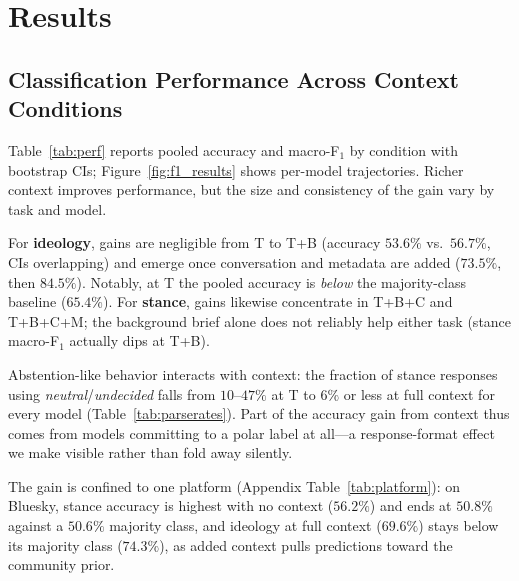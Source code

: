 \documentclass[11pt]{article}
\begin{document}
\section{Results}
\label{sec:results}

\subsection{Classification Performance Across Context Conditions}
\label{sec:results_performance}

Table~\ref{tab:perf} reports pooled accuracy and macro-F$_1$ by condition with bootstrap CIs; Figure~\ref{fig:f1_results} shows per-model trajectories. Richer context improves performance, but the size and consistency of the gain vary by task and model.

For \textbf{ideology}, gains are negligible from T to T+B (accuracy $53.6\%$ vs.\ $56.7\%$, CIs overlapping) and emerge once conversation and metadata are added ($73.5\%$, then $84.5\%$). Notably, at T the pooled accuracy is \emph{below} the majority-class baseline ($65.4\%$). For \textbf{stance}, gains likewise concentrate in T+B+C and T+B+C+M; the background brief alone does not reliably help either task (stance macro-F$_1$ actually dips at T+B).

Abstention-like behavior interacts with context: the fraction of stance responses using \emph{neutral}/\emph{undecided} falls from $10$--$47\%$ at T to $6\%$ or less at full context for every model (Table~\ref{tab:parserates}). Part of the accuracy gain from context thus comes from models committing to a polar label at all---a response-format effect we make visible rather than fold away silently.

The gain is confined to one platform (Appendix Table~\ref{tab:platform}): on Bluesky, stance accuracy is highest with no context ($56.2\%$) and ends at $50.8\%$ against a $50.6\%$ majority class, and ideology at full context ($69.6\%$) stays below its majority class ($74.3\%$), as added context pulls predictions toward the community prior.
\end{document}
